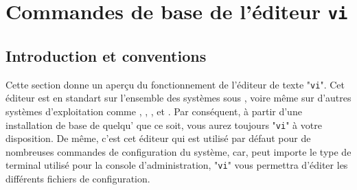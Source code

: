 %
%

\section{\label{ann-edt-vi}Commandes de base de l'{\'e}diteur {\tt vi}}

\subsection{\label{ann-edt-vi-intro}Introduction et conventions}

Cette section donne un aper\c{c}u du fonctionnement de l'{\'e}diteur de
texte "{\tt vi}". Cet {\'e}diteur est en standart sur l'ensemble des
syst{\`e}mes sous {\Unix}, voire m{\^e}me sur d'autres syst{\`e}mes
d'exploitation comme {\OpenVMS}, {\DOS}, {\MacOS}, {\Windows} et
{\WindowsNT}. Par cons{\'e}quent, {\`a} partir d'une installation de
base de quelqu'{\Unix} que ce soit, vous aurez toujours "{\tt vi}"
{\`a} votre disposition. De m{\^e}me, c'est cet {\'e}diteur qui est
utilis{\'e} par d{\'e}faut pour de nombreuses commandes de configuration
du syst{\`e}me, car, peut importe le type de terminal utilis{\'e} pour
la console d'administration, "{\tt vi}" vous permettra d'{\'e}diter
les diff{\'e}rents fichiers de configuration.

